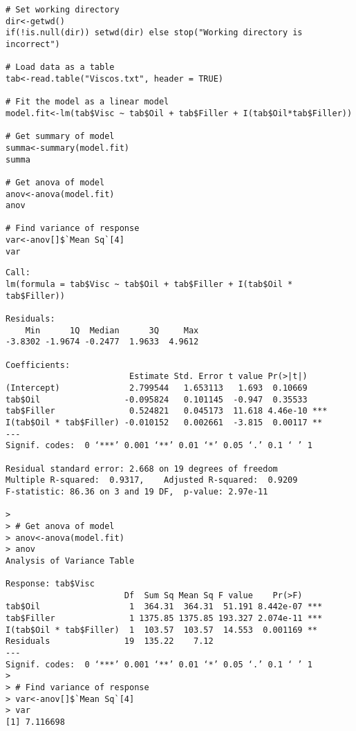 \documentclass[12pt]{article}
\begin{document}
\begin{lstlisting}[caption={Linear regression summary method},label={R_lin_code}]
# Set working directory
dir<-getwd()
if(!is.null(dir)) setwd(dir) else stop("Working directory is incorrect")

# Load data as a table
tab<-read.table("Viscos.txt", header = TRUE)

# Fit the model as a linear model
model.fit<-lm(tab$Visc ~ tab$Oil + tab$Filler + I(tab$Oil*tab$Filler))

# Get summary of model
summa<-summary(model.fit)
summa

# Get anova of model
anov<-anova(model.fit)
anov

# Find variance of response
var<-anov[]$`Mean Sq`[4]
var
\end{lstlisting}

\begin{lstlisting}[caption={Linear regression summary results},label={R_lin_analysis}]
Call:
lm(formula = tab$Visc ~ tab$Oil + tab$Filler + I(tab$Oil * tab$Filler))

Residuals:
    Min      1Q  Median      3Q     Max
-3.8302 -1.9674 -0.2477  1.9633  4.9612

Coefficients:
                         Estimate Std. Error t value Pr(>|t|)
(Intercept)              2.799544   1.653113   1.693  0.10669
tab$Oil                 -0.095824   0.101145  -0.947  0.35533
tab$Filler               0.524821   0.045173  11.618 4.46e-10 ***
I(tab$Oil * tab$Filler) -0.010152   0.002661  -3.815  0.00117 **
---
Signif. codes:  0 ‘***’ 0.001 ‘**’ 0.01 ‘*’ 0.05 ‘.’ 0.1 ‘ ’ 1

Residual standard error: 2.668 on 19 degrees of freedom
Multiple R-squared:  0.9317,	Adjusted R-squared:  0.9209
F-statistic: 86.36 on 3 and 19 DF,  p-value: 2.97e-11

>
> # Get anova of model
> anov<-anova(model.fit)
> anov
Analysis of Variance Table

Response: tab$Visc
                        Df  Sum Sq Mean Sq F value    Pr(>F)
tab$Oil                  1  364.31  364.31  51.191 8.442e-07 ***
tab$Filler               1 1375.85 1375.85 193.327 2.074e-11 ***
I(tab$Oil * tab$Filler)  1  103.57  103.57  14.553  0.001169 **
Residuals               19  135.22    7.12
---
Signif. codes:  0 ‘***’ 0.001 ‘**’ 0.01 ‘*’ 0.05 ‘.’ 0.1 ‘ ’ 1
>
> # Find variance of response
> var<-anov[]$`Mean Sq`[4]
> var
[1] 7.116698
\end{lstlisting}
\end{document}
